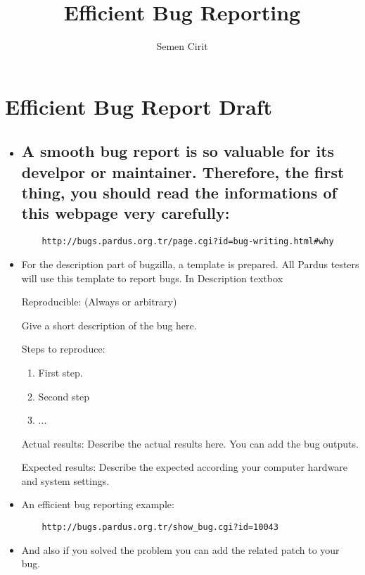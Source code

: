 \documentclass[a4paper,10pt]{article}
\title{Efficient Bug Reporting}
\author{Semen Cirit}
\begin{document}
\maketitle

\section{Efficient Bug Report Draft}

\begin{itemize}
 
  	\item \subsection*{A smooth bug report is so valuable for its develpor or maintainer. Therefore, the first thing, you should read the informations of this webpage very carefully:}
	\begin{verbatim} 
 	http://bugs.pardus.org.tr/page.cgi?id=bug-writing.html#why
	\end{verbatim}

  	\item For the description part of bugzilla, a template is prepared. All Pardus testers will use this template to report bugs.
  	In Description textbox

   	Reproducible: (Always or arbitrary)	
   
    	Give a short description of the bug here.
   
   	Steps to reproduce:
   	\begin{enumerate}
    	\item First step.
    	\item Second step
    	\item ...
   	\end{enumerate}

	Actual results:
	Describe the actual results here. You can add the bug outputs.
	
	Expected results:
	Describe the expected according your computer hardware and system settings.
	
	\item An efficient bug reporting example:
	\begin{verbatim}
	http://bugs.pardus.org.tr/show_bug.cgi?id=10043
	\end{verbatim}
	\item And also if you solved the problem you can add the related patch to your bug.


\end{itemize}
\end{document}
